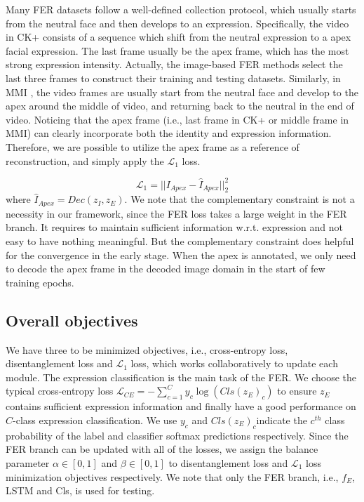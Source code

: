 \documentclass[a4paper,conference]{IEEEtran}
\begin{document}
Many FER datasets follow a well-defined collection protocol, which usually starts from the neutral face and then develops to an expression. Specifically, the video in CK+ \cite{kanade2000comprehensive,lucey2010extended} consists of a sequence which shift from the neutral expression to a apex facial expression. The last frame usually be the apex frame, which has the most strong expression intensity. Actually, the image-based FER methods select the last three frames to construct their training and testing datasets. Similarly, in MMI \cite{pantic2005web}, the video frames are usually start from the neutral face and develop to the apex around the middle of video, and returning back to the neutral in the end of video. Noticing that the apex frame (i.e., last frame in CK+ or middle frame in MMI) can clearly incorporate both the identity and expression information. Therefore, we are possible to utilize the apex frame as a reference of reconstruction, and simply apply the $\mathcal{L}_1$ loss.  

\begin{equation} \label{eq:l1}
\mathcal{L}_1 = ||I_{Apex}-\hat{I}_{Apex}||_2^2
\end{equation}where $\hat{I}_{Apex}=Dec(z_{I},z_{E})$. We note that the complementary constraint is not a necessity in our framework, since the FER loss takes a large weight in the FER branch. It requires to maintain sufficient information w.r.t. expression and not easy to have nothing meaningful. But the complementary constraint does helpful for the convergence in the early stage. When the apex is annotated, we only need to decode the apex frame in the decoded image domain in the start of few training epochs.














\subsection{Overall objectives}


 We have three to be minimized objectives, i.e., cross-entropy loss, disentanglement loss \cite{liu2019feature} and $\mathcal{L}_1$ loss, which works collaboratively to update each module. The expression classification is the main task of the FER. We choose the typical cross-entropy loss $\mathcal{L}_{CE} = -\sum_{c=1}^C y_{c}\log(Cls(z_E)_{c})$ to ensure $z_E$ contains sufficient expression information and finally have a good performance on $C$-class expression classification. We use $y_{c}$ and $Cls(z_E)_{c}$indicate the $c^{th}$ class probability of the label and classifier softmax predictions respectively. Since the FER branch can be updated with all of the losses, we assign the balance parameter $\alpha\in[0,1]$ and $\beta\in[0,1]$ to disentanglement loss \cite{liu2019feature} and $\mathcal{L}_1$ loss minimization objectives respectively. We note that only the FER branch, i.e., $f_E$, LSTM and Cls, is used for testing. 
\end{document}
